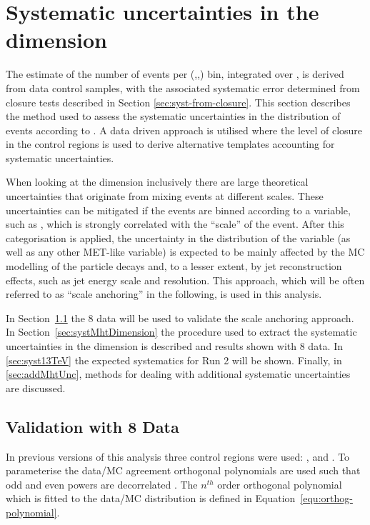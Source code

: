 \section{Systematic uncertainties in the \mht dimension}
\label{sec:mhtTemplate}

The estimate of the number of events per (\njet,\nb,\scalht) bin,
integrated over \mht, is derived from data control samples, with
the associated systematic error determined from closure tests
described in Section \ref{sec:syst-from-closure}. This section
describes the method used to assess the systematic uncertainties in
the distribution of events according to \mht. A data driven approach is
utilised where the level of closure in the control regions is used
to derive alternative templates accounting for systematic uncertainties. 

When looking at the \mht dimension inclusively there are
large theoretical uncertainties that originate from mixing events
at different scales. These uncertainties can be mitigated if the events 
are binned according to a variable, such as \scalht, 
which is strongly correlated with the “scale” of the event. 
After this categorisation is applied, the uncertainty in 
the distribution of the \mht variable
(as well as any other MET-like variable) is expected to be 
mainly affected by the MC modelling of the particle 
decays and, to a lesser extent, by jet reconstruction effects, 
such as jet energy scale and resolution. 
This approach, which will be often referred to as “scale anchoring” 
in the following, is used in this analysis.

In Section~\ref{sec:valid8} the 8 \TeV data will be used 
to validate the scale anchoring approach. 
In Section~\ref{sec:systMhtDimension} 
the procedure used to extract the systematic uncertainties in the 
\mht dimension is described and results shown with 8 \TeV data. 
In \ref{sec:syst13TeV} the expected systematics for Run 2 will be shown. 
Finally, in \ref{sec:addMhtUnc}, methods for dealing with 
additional systematic uncertainties are discussed.



\subsection{Validation with 8 \TeV Data}
\label{sec:valid8}
In previous versions of this analysis three control regions
were used: \mj, \mmj and \gj. To parameterise the data/MC agreement
orthogonal polynomials are used such that odd and even powers 
are decorrelated \cite{cohen2013applied}. 
The $n^{th}$ order orthogonal polynomial which is fitted to the data/MC 
distribution is defined in Equation~\ref{equ:orthog-polynomial}.

